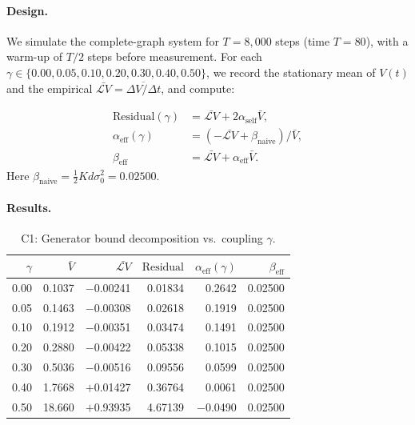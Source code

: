\documentclass[12pt]{article}
\theoremstyle{plain}
\theoremstyle{definition}
\newcommand{\Lgen}{\mathcal{L}}
\begin{document}
\paragraph{Design.}
\begin{sloppypar}
We simulate the complete-graph system for $T = 8{,}000$ steps
(time $T = 80$), with a warm-up of $T/2$ steps before measurement.
For each $\gamma \in \{0.00, 0.05, 0.10, 0.20, 0.30, 0.40, 0.50\}$,
we record the stationary mean of $V(t)$ and the empirical
$\bar{\Lgen V} = \overline{\Delta V / \Delta t}$, and compute:
\end{sloppypar}
\begin{align*}
  \text{Residual}(\gamma) &= \bar{\Lgen V} + 2\alpha_{\mathrm{self}} \bar V, \\
  \alpha_{\mathrm{eff}}(\gamma) &=
    (-\bar{\Lgen V} + \beta_{\mathrm{naive}}) / \bar V, \\
  \beta_{\mathrm{eff}} &= \bar{\Lgen V} + \alpha_{\mathrm{eff}} \bar V.
\end{align*}
Here $\beta_{\mathrm{naive}} = \tfrac{1}{2}Kd\sigma_0^2 = 0.02500$.

\paragraph{Results.}

\begin{table}[H]
\centering
\caption{C1: Generator bound decomposition vs.\ coupling $\gamma$.}
\label{tab:c1}
\begin{tabular}{rrrrrr}
\toprule
$\gamma$ & $\bar V$ & $\bar{\Lgen V}$ &
$\text{Residual}$ & $\alpha_{\mathrm{eff}}(\gamma)$ & $\beta_{\mathrm{eff}}$ \\
\midrule
0.00 & 0.1037 & $-$0.00241 & 0.01834 & 0.2642 & 0.02500 \\
0.05 & 0.1463 & $-$0.00308 & 0.02618 & 0.1919 & 0.02500 \\
0.10 & 0.1912 & $-$0.00351 & 0.03474 & 0.1491 & 0.02500 \\
0.20 & 0.2880 & $-$0.00422 & 0.05338 & 0.1015 & 0.02500 \\
0.30 & 0.5036 & $-$0.00516 & 0.09556 & 0.0599 & 0.02500 \\
0.40 & 1.7668 & $+$0.01427 & 0.36764 & 0.0061 & 0.02500 \\
0.50 & 18.660 & $+$0.93935 & 4.67139 & $-$0.0490 & 0.02500 \\
\bottomrule
\end{tabular}
\end{table}
\end{document}
